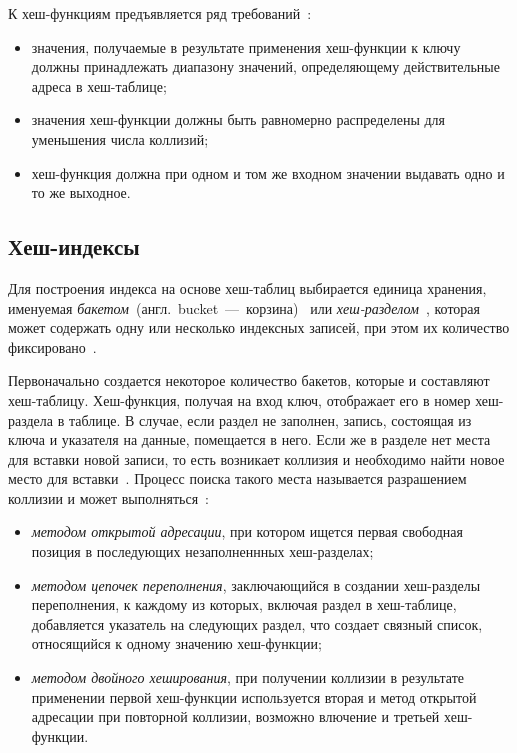 К хеш-функциям предъявляется ряд требований~\cite{baw, marvel}:
\begin{itemize}
    \item значения, получаемые в результате применения хеш-функции к ключу
        должны принадлежать диапазону значений, определяющему действительные
        адреса в хеш-таблице;
    \item значения хеш-функции должны быть равномерно распределены для
        уменьшения числа коллизий;
    \item хеш-функция должна при одном и том же входном значении выдавать одно
        и то же выходное.
\end{itemize}

\subsection{Хеш-индексы}

Для построения индекса на основе хеш-таблиц выбирается единица хранения,
именуемая
\mbox{\textit{бакетом}~(англ.~bucket~---~\mbox{корзина}})~\cite{marvel} или
\mbox{\textit{хеш-разделом}~\cite{amur}}, которая может содержать одну или
несколько индексных записей, при этом их количество фиксировано~\cite{ship}.

Первоначально создается некоторое количество бакетов, которые и составляют
хеш-таблицу. Хеш-функция, получая на вход ключ, отображает его в номер
хеш-раздела в таблице. В случае, если раздел не заполнен, запись, состоящая из
ключа и указателя на данные, помещается в него. Если же в разделе нет места для
вставки новой записи, то есть возникает коллизия и необходимо найти новое место
для вставки~\cite{marvel}. Процесс поиска такого места называется разрашением
коллизии и может выполняться~\cite{baw}:

\begin{itemize}
    \item \textit{методом открытой адресации}, при котором ищется первая свободная
        позиция в последующих незаполненнных хеш-разделах;
    \item \textit{методом цепочек переполнения}, заключающийся в создании хеш-разделы
        переполнения, к каждому из которых, включая раздел в хеш-таблице,
        добавляется указатель на следующих раздел, что создает связный список,
        относящийся к одному значению хеш-функции;
    \item \textit{методом двойного хеширования}, при получении коллизии в
        результате применении первой хеш-функции используется вторая и метод
        открытой адресации при повторной коллизии, возможно влючение и третьей
        хеш-функции.
\end{itemize}

